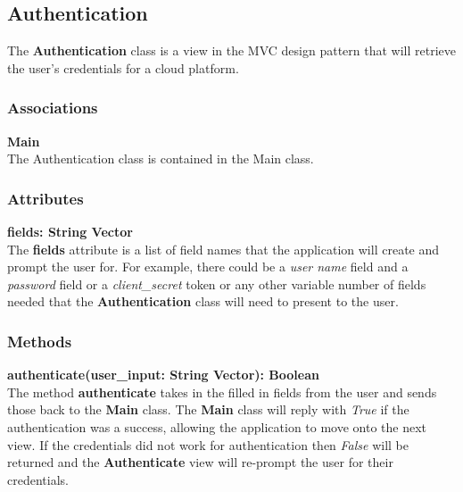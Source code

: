 \subsection{Authentication}
The \textbf{Authentication} class is a view in the MVC design pattern that will retrieve the user's
credentials for a cloud platform.

\subsubsection{Associations}
\textbf{Main} \\
The Authentication class is contained in the Main class.


\subsubsection{Attributes}
\textbf{fields: String Vector} \\
The \textbf{fields} attribute is a list of field names that the application will create and prompt the user
for. For example, there could be a \textit{user name} field and a \textit{password} field or a \textit{
client\_secret} token or any other variable number of fields needed that the \textbf{Authentication} class
will need to present to the user.

\subsubsection{Methods}
\textbf{authenticate(user\_input: String Vector): Boolean} \\
The method \textbf{authenticate} takes in the filled in fields from the user and sends those back to the
\textbf{Main} class. The \textbf{Main} class will reply with \textit{True} if the authentication was a
success, allowing the application to move onto the next view. If the credentials did not work for
authentication then \textit{False} will be returned and the \textbf{Authenticate} view will re-prompt the user
for their credentials.
  
